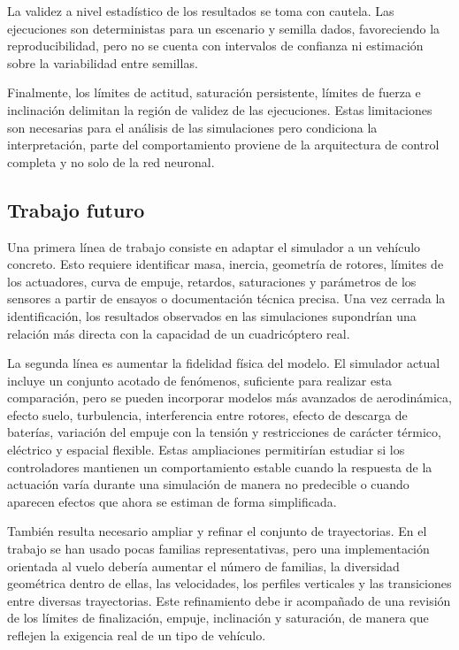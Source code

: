 La validez a nivel estadístico de los resultados se toma con cautela. Las ejecuciones son deterministas
para un escenario y semilla dados, favoreciendo la reproducibilidad, pero no se cuenta con intervalos
de confianza ni estimación sobre la variabilidad entre semillas. 

Finalmente, los límites de actitud, saturación persistente, límites de fuerza e inclinación delimitan
la región de validez de las ejecuciones. Estas limitaciones son necesarias para el análisis de las
simulaciones pero condiciona la interpretación, parte del comportamiento proviene de la arquitectura
de control completa y no solo de la red neuronal.

\subsection{Trabajo futuro}

Una primera línea de trabajo consiste en adaptar el simulador a un vehículo
concreto. Esto requiere identificar masa, inercia, geometría de rotores, límites
de los actuadores, curva de empuje, retardos, saturaciones y parámetros de los
sensores a partir de ensayos o documentación técnica precisa. Una vez cerrada la
identificación, los resultados observados en las simulaciones supondrían una relación
más directa con la capacidad de un cuadricóptero real.

La segunda línea es aumentar la fidelidad física del modelo. El simulador actual
incluye un conjunto acotado de fenómenos, suficiente para realizar esta comparación,
pero se pueden incorporar modelos más avanzados de aerodinámica, efecto suelo, turbulencia,
interferencia entre rotores, efecto de descarga de baterías, variación del empuje con la
tensión y restricciones de carácter térmico, eléctrico y espacial flexible. Estas ampliaciones
permitirían estudiar si los controladores mantienen un comportamiento estable cuando la respuesta
de la actuación varía durante una simulación de manera no predecible o cuando aparecen
efectos que ahora se estiman de forma simplificada.

También resulta necesario ampliar y refinar el conjunto de trayectorias. En el trabajo se
han usado pocas familias representativas, pero una implementación orientada
al vuelo debería aumentar el número de familias, la diversidad geométrica dentro de ellas,
las velocidades, los perfiles verticales y las transiciones entre diversas trayectorias.
Este refinamiento debe ir acompañado de una revisión de los límites de finalización, empuje,
inclinación y saturación, de manera que reflejen la exigencia real de un tipo de vehículo.

